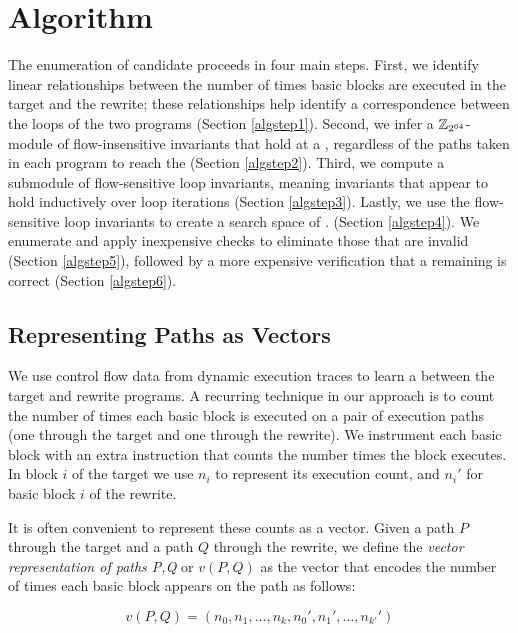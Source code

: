 \section{Algorithm}


The enumeration of candidate \bisimreps{} proceeds in four main steps.
First, we identify linear relationships between the number of times
basic blocks are executed in the target and the rewrite; these
relationships help identify a correspondence between the loops
of the two programs (Section \ref{algstep1}). Second, we infer
a $\mathbb{Z}_{2^{64}}$-module of flow-insensitive invariants that hold at a
\cutpoint, regardless of the paths taken in each program to reach the
\cutpoint{} (Section \ref{algstep2}). Third, we compute a submodule
of flow-sensitive loop invariants, meaning invariants that appear
to hold inductively over loop iterations (Section \ref{algstep3}).
Lastly, we use the flow-sensitive loop invariants to create a search
space of \bisimreps. (Section \ref{algstep4}). We enumerate \bisimreps and
apply inexpensive checks to eliminate those that are invalid (Section
\ref{algstep5}), followed by a more expensive verification that a
remaining \bisimrep{} is correct (Section \ref{algstep6}).

\subsection{Representing Paths as Vectors}

We use control flow data from dynamic execution traces to learn
a \bisim{} between the target and rewrite programs. A recurring
technique in our approach is to count the number of times each basic
block is executed on a pair of execution paths (one through the target
and one through the rewrite). We instrument each basic block with an
extra instruction that counts the number times the block executes.
In block $i$ of the target we use \shadow{} $n_i$ to represent its
execution count, and $n_i'$ for basic block $i$ of the rewrite.

It is often convenient to represent these counts as a vector. Given
a path $P$ through the target and a path $Q$ through the rewrite, we
define the \emph{vector representation of paths P,Q} or $v(P,Q)$ as
the vector that encodes the number of times each basic block appears
on the path as follows:

$$v(P,Q) = \left( n_0, n_1, \dotsc, n_k, n_0', n_1', \dotsc, n_{k'}' \right)$$

